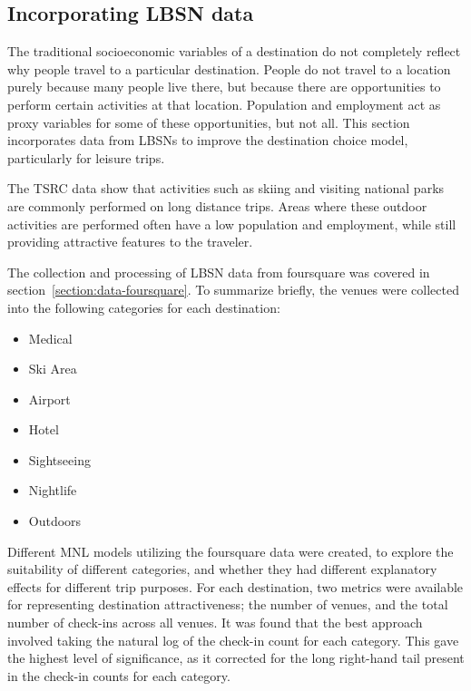 \subsection{Incorporating LBSN data}

The traditional socioeconomic variables of a destination do not completely reflect why people travel to a particular destination. People do not travel to a location purely because many people live there, but because there are opportunities to perform certain activities at that location. Population and employment act as proxy variables for some of these opportunities, but not all. This section incorporates data from LBSNs to improve the destination choice model, particularly for leisure trips.  

The TSRC data show that activities such as skiing and visiting national parks are commonly performed on long distance trips. Areas where these outdoor activities are performed often have a low population and employment, while still providing attractive features to the traveler.

The collection and processing of LBSN data from foursquare was covered in section~\ref{section:data-foursquare}. To summarize briefly, the venues were collected into the following categories for each destination:
\begin{multicols}{2}
\raggedcolumns
\begin{itemize}
\item Medical
\item Ski Area
\item Airport
\item Hotel
\item Sightseeing
\item Nightlife
\item Outdoors
\end{itemize}
\end{multicols}


Different MNL models utilizing the foursquare data were created, to explore the suitability of different categories, and whether they had different explanatory effects for different trip purposes. For each destination, two metrics were available for representing destination attractiveness; the number of venues, and the total number of check-ins across all venues.
It was found that the best approach involved taking the natural log of the check-in count for each category. This gave the highest level of significance, as it corrected for the long right-hand tail present in the check-in counts for each category.

